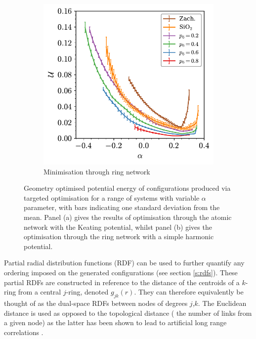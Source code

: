 \begin{figure}[bt]
\begin{subfigure}[b]{0.45\textwidth}
         \includegraphics[width=\textwidth]{./figures/targeted_opt/topt_u_dual.pdf}
         \caption{Minimisation through ring network}
         \label{fig:toptenergy2}
     \end{subfigure}

     \caption{Geometry optimised potential energy of configurations produced via targeted optimisation for a range of systems with variable $\alpha$ parameter, with bars indicating one standard deviation from the mean. Panel (a) gives the results of optimisation through the atomic network with the Keating potential, whilst panel (b) gives the optimisation through the ring network with a simple harmonic potential.}
     \label{fig:toptenergy}
\end{figure}

Partial radial distribution functions (RDF) can be used to further quantify any ordering imposed on the generated configurations (see section \ref{s:rdfs}).
These partial RDFs are constructed in reference to the distance of the centroids of a $k$\--ring from a central $j$\--ring, denoted $g_{jk}\left(r\right)$.
They can therefore equivalently be thought of as the dual\--space RDFs between nodes of degrees $j$,$k$.
The Euclidean distance is used as opposed to the topological distance (\ie{} the number of links from a given node) as the latter has been shown to lead to artificial long range correlations \cite{Sadjadi2016}. 

